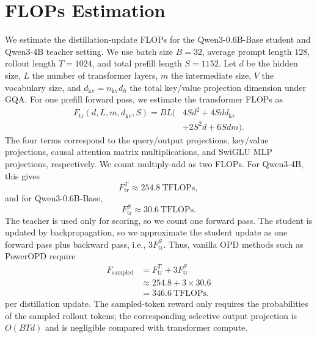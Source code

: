\section{FLOPs Estimation}
\label{app:flops}

We estimate the distillation-update FLOPs for the Qwen3-0.6B-Base student and Qwen3-4B teacher setting. We use batch size \(B=32\), average prompt length \(128\), rollout length \(T=1024\), and total prefill length \(S=1152\). Let \(d\) be the hidden size, \(L\) the number of transformer layers, \(m\) the intermediate size, \(V\) the vocabulary size, and \(d_{\mathrm{kv}}=n_{\mathrm{kv}}d_h\) the total key/value projection dimension under GQA. For one prefill forward pass, we estimate the transformer FLOPs as
\[
\begin{aligned}
F_{\mathrm{tr}}(d,L,m,d_{\mathrm{kv}},S)
= BL \Big(
&4Sd^2 + 4Sdd_{\mathrm{kv}} \\
&+ 2S^2d + 6Sdm
\Big).
\end{aligned}
\]
The four terms correspond to the query/output projections, key/value projections, causal attention matrix multiplications, and SwiGLU MLP projections, respectively. We count multiply-add as two FLOPs. For Qwen3-4B, this gives
\[
F_{\mathrm{tr}}^{T} \approx 254.8\ \mathrm{TFLOPs},
\]
and for Qwen3-0.6B-Base,
\[
F_{\mathrm{tr}}^{S} \approx 30.6\ \mathrm{TFLOPs}.
\]
The teacher is used only for scoring, so we count one forward pass. The student is updated by backpropagation, so we approximate the student update as one forward pass plus backward pass, i.e., \(3F_{\mathrm{tr}}^{S}\). Thus, vanilla OPD methods such as PowerOPD require
\[
\begin{aligned}
F_{\mathrm{sampled}}
&= F_{\mathrm{tr}}^{T} + 3F_{\mathrm{tr}}^{S} \\
&\approx 254.8 + 3\times 30.6 \\
&= 346.6\ \mathrm{TFLOPs}.
\end{aligned}
\]
per distillation update. The sampled-token reward only requires the probabilities of the sampled rollout tokens; the corresponding selective output projection is \(O(BTd)\) and is negligible compared with transformer compute.

